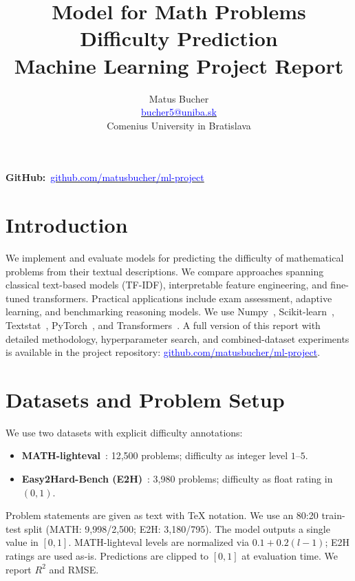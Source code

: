 \documentclass[twocolumn, 10pt]{article}
\title{\textbf{Model for Math Problems Difficulty Prediction}\\[4pt]
\large Machine Learning Project Report}
\author{Matus Bucher\\
\small \href{mailto:bucher5@uniba.sk}{\textcolor{blue}{bucher5@uniba.sk}}\\
\small Comenius University in Bratislava}
\date{}
\begin{document}
\maketitle
\vspace{-10pt}

\noindent\textbf{GitHub:}~\href{https://github.com/matusbucher/ml-project}{\textcolor{blue}{github.com/matusbucher/ml-project}}

\section{Introduction}

We implement and evaluate models for predicting the difficulty of mathematical problems from their textual descriptions. We compare approaches spanning classical text-based models (TF-IDF), interpretable feature engineering, and fine-tuned transformers. Practical applications include exam assessment, adaptive learning, and benchmarking reasoning models. We use Numpy~\cite{numpy}, Scikit-learn~\cite{scikit-learn}, Textstat~\cite{textstat}, PyTorch~\cite{pytorch}, and Transformers~\cite{transformers}. A full version of this report with detailed methodology, hyperparameter search, and combined-dataset experiments is available in the project repository: \href{https://github.com/matusbucher/ml-project}{\textcolor{blue}{github.com/matusbucher/ml-project}}.

\section{Datasets and Problem Setup}

We use two datasets with explicit difficulty annotations:
\begin{itemize}[noitemsep, topsep=2pt]
  \item \textbf{MATH-lighteval}~\cite{math}: 12{,}500 problems; difficulty as integer level $1$--$5$.
  \item \textbf{Easy2Hard-Bench (E2H)}~\cite{easy2hard}: 3{,}980 problems; difficulty as float rating in $(0,1)$.
\end{itemize}

Problem statements are given as text with \TeX{} notation. We use an 80:20 train-test split (MATH: 9{,}998/2{,}500; E2H: 3{,}180/795). The model outputs a single value in $[0,1]$. MATH-lighteval levels are normalized via $0.1 + 0.2(l-1)$; E2H ratings are used as-is. Predictions are clipped to $[0,1]$ at evaluation time. We report $R^2$ and RMSE.
\end{document}
